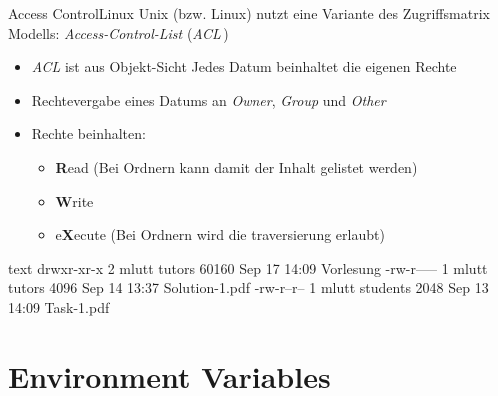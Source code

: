 \documentclass{setbeamer}
\begin{document}
\begin{frame}[fragile]{Access Control\textemdash Linux}
    Unix (bzw. Linux) nutzt eine Variante des Zugriffsmatrix Modells: \emph{Access-Control-List} (\emph{ACL}\,)
    \begin{itemize}
        \item \emph{ACL} ist aus Objekt-Sicht {\Large \MVRightarrow} Jedes Datum beinhaltet die eigenen Rechte
        \item Rechtevergabe eines Datums an \emph{Owner}, \emph{Group} und \emph{Other}
        \item Rechte beinhalten:
        \begin{itemize}
            \item \textbf{R}ead (Bei Ordnern kann damit der Inhalt gelistet werden)
            \item \textbf{W}rite
            \item e\textbf{X}ecute (Bei Ordnern wird die traversierung erlaubt)
        \end{itemize}
    \end{itemize}

    \pause
    \vspace{0.3cm}

    \begin{TUMCodeBlock}{}{text}
        drwxr-xr-x 2 mlutt tutors   60160 Sep 17 14:09 Vorlesung
        -rw-r----- 1 mlutt tutors    4096 Sep 14 13:37 Solution-1.pdf
        -rw-r--r-- 1 mlutt students  2048 Sep 13 14:09 Task-1.pdf
    \end{TUMCodeBlock}
\end{frame}

\section{Environment Variables}
\end{document}
